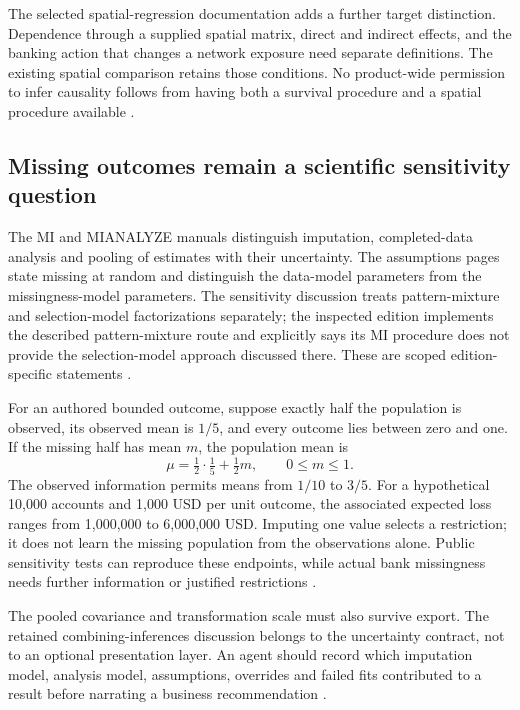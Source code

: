 The selected spatial-regression documentation adds a further target
distinction. Dependence through a supplied spatial matrix, direct and
indirect effects, and the banking action that changes a network exposure
need separate definitions. The existing spatial comparison retains those
conditions. No product-wide permission to infer causality follows from
having both a survival procedure and a spatial procedure available
\cite{exec20_network_sas_latest_spatial,exec24_sas_choice}.

\subsection{Missing outcomes remain a scientific sensitivity question}
The MI and MIANALYZE manuals distinguish imputation, completed-data analysis
and pooling of estimates with their uncertainty. The assumptions pages
state missing at random and distinguish the data-model parameters from
the missingness-model parameters. The sensitivity discussion treats
pattern-mixture and selection-model factorizations separately; the
inspected edition implements the described pattern-mixture route and
explicitly says its MI procedure does not provide the selection-model
approach discussed there. These are scoped edition-specific statements
\cite{exec21_transport_sas_mi_intro,exec21_transport_sas_mianalyze_intro,
exec21_transport_sas_assumptions,exec21_transport_sas_sensitivity}.

For an authored bounded outcome, suppose exactly half the population is
observed, its observed mean is $1/5$, and every outcome lies between zero
and one. If the missing half has mean $m$, the population mean is
\[
 \mu=\tfrac12\cdot\tfrac15+\tfrac12m,
 \qquad 0\leq m\leq1.
\]
The observed information permits means from $1/10$ to $3/5$. For a
hypothetical 10,000 accounts and 1,000 USD per unit outcome, the associated
expected loss ranges from 1,000,000 to 6,000,000 USD. Imputing one value
selects a restriction; it does not learn the missing population from the
observations alone. Public sensitivity tests can reproduce these endpoints,
while actual bank missingness needs further information or justified
restrictions \cite{exec24_sas_choice}.

The pooled covariance and transformation scale must also survive export.
The retained combining-inferences discussion belongs to the uncertainty
contract, not to an optional presentation layer. An agent should record
which imputation model, analysis model, assumptions, overrides and failed
fits contributed to a result before narrating a business recommendation
\cite{exec21_transport_sas_combining,exec21_transport_sas_mianalyze_intro,
exec24_sas_choice}.

